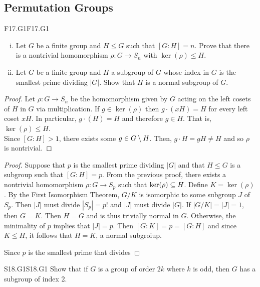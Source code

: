 \documentclass[../AlgebraQualSolutions.tex]{subfiles}
\begin{document}
\subsection{Permutation Groups}

\begin{prob}{F17.G1}{F17.G1}
    \begin{enumerate}[(i)]
        \item Let $G$ be a finite group and $H \leq G$ such that $[G:H] = n$. Prove that there is a nontrivial homomorphism $\rho: G \to S_n$ with $\ker(\rho)\leq H$.
        \item Let $G$ be a finite group and $H$ a subgroup of $G$ whose index in $G$ is the smallest prime dividing $|G|$. Show that $H$ is a normal subgroup of $G$.
    \end{enumerate}
\end{prob}

\begin{proof}
    Let $\rho: G \to S_n$ be the homomorphism given by $G$ acting on the left cosets of $H$ in $G$ via multiplication. If $g \in \ker(\rho)$ then $g\cdot(xH) = H$ for every left coset $xH$. In particular, $g\cdot(H) = H$ and therefore $g \in H$. That is, $\ker(\rho) \leq H$.\\

    Since $[G:H] > 1$, there exists some $g \in G\setminus H$. Then, $g\cdot H = gH \neq H$ and so $\rho$ is nontrivial.
\end{proof}

\begin{proof}
    Suppose that $p$ is the smallest prime dividing $|G|$ and that $H \leq G$ is a subgroup such that $[G:H] = p$. From the previous proof, there exists a nontrivial homomorphism $\rho: G \to S_p$ such that $\ker(\rho) \subseteq H$. Define $K = \ker(\rho)$. By the First Isomorphism Theorem, $G/K$ is isomorphic to some subgroup $J$ of $S_p$. Then $|J|$ must divide $|S_p| = p!$ and $|J|$ must divide $|G|$. If $|G/K| = |J| = 1$, then $G = K$. Then $H = G$ and is thus trivially normal in $G$. Otherwise, the minimality of $p$ implies that $|J| = p$. Then $[G:K] = p = [G:H]$ and since $K \leq H$, it follows  that $H = K$, a normal subgroiup.
    
    Since $p$ is the smallest prime that divides 
\end{proof}


\begin{prob}{S18.G1}{S18.G1}
    Show that if $G$ is a group of order $2k$ where $k$ is odd, then $G$ has a subgroup of index 2.
\end{prob}
\end{document}
